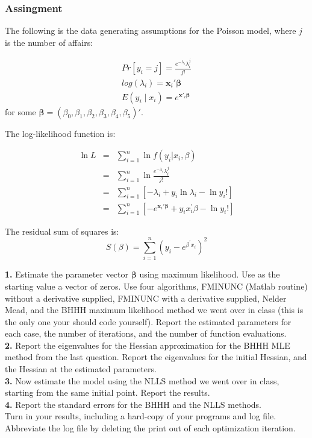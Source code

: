 \documentclass[10pt]{article}
\newcommand{\bs}{\boldsymbol}
\begin{document}
\subsubsection*{Assingment} %
\label{ssub:assingment}

 The following is the data generating assumptions for the Poisson model, where $j$ is the number of affairs:

 \begin{align}
 	Pr[y_i=j] = \frac{e^{-\lambda_i}\lambda_i^j}{j!}\\
 	log(\lambda_i) = \bs{x}_i'\bs{\beta} \\
 	E(y_i\mid x_i) = e^{\bs{x}'_i\bs{\beta}}
 \end{align}
 for some $\bs{\beta} = (\beta_0,\beta_1,\beta_2,\beta_3,\beta_4,\beta_5)'$.

 The log-likelihood function is: 

\begin{eqnarray*}
\ln L &=&\sum\limits_{i=1}^{n}\ln f\left( y_{i}\left\vert x_{i}\right.
,\beta \right) \\
&=&\sum\limits_{i=1}^{n}\ln \frac{e^{-\lambda _{i}}\lambda _{i}^{j}}{j!} \\
&=&\sum\limits_{i=1}^{n}\left[ -\lambda _{i}+y_{i}\ln \lambda _{i}-\ln y_i!%
\right] \\
&=&\sum\limits_{i=1}^{n}\left[ -e^{\mathbf{x}_{i}\prime \mathbf{\beta }%
}+y_{i}x_{i}^{\prime }\beta -\ln y_{i}!\right]
\end{eqnarray*}

The residual sum of squares is:%
\[
S\left( \beta \right) =\sum\limits_{i=1}^{n}\left( y_{i}-e^{\beta ^{\prime
}x_{i}}\right) ^{2} 
\]



\noindent \textbf{1.} Estimate the parameter vector $\bs{\beta}$ using maximum likelihood. Use as the starting value a vector of zeros. Use four algorithms, FMINUNC (Matlab routine) without a derivative supplied, FMINUNC with a derivative supplied, Nelder Mead, and the BHHH maximum likelihood method we went over in class (this is the only one your should code yourself). Report the estimated parameters for each case, the number of iterations, and the number of function evaluations.\\

\noindent \textbf{2.} Report the eigenvalues for the Hessian approximation for the BHHH MLE method from the last question. Report the eigenvalues for the initial Hessian, and the Hessian at the estimated parameters.  \\

\noindent \textbf{3.} Now estimate the model using the NLLS method we went over in class, starting from the same initial point. Report the results. \\

\noindent \textbf{4.} Report the standard errors for the BHHH and the NLLS methods. \\


\noindent
Turn in your results, including a hard-copy of your programs and log file. Abbreviate the log file by deleting the print out of each optimization iteration. 
\end{document}
